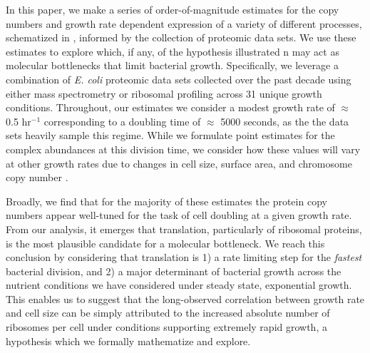 In this paper, we make a series of order-of-magnitude estimates for the copy
numbers and growth rate dependent expression of a variety of different
processes, schematized in , informed by the collection of
proteomic data sets. We use these estimates to explore which, if any, of the
hypothesis illustrated n  may act as molecular bottlenecks
that limit bacterial growth. Specifically, we leverage a combination of
\textit{E. coli} proteomic data sets collected over the past decade using
either mass spectrometry \citep{schmidt2016, peebo2015, valgepea2013} or
ribosomal profiling \citep{li2014} across 31 unique growth conditions.
Throughout, our estimates we consider a modest growth rate of $\approx$ 0.5
hr$^{-1}$ corresponding to a doubling time of $\approx$ 5000 seconds, as the
the data sets heavily sample this regime. While we formulate point estimates
for the complex abundances at this division time, we consider how these
values will vary at other growth rates due to changes in cell size, surface
area, and chromosome copy number \citep{taheriaraghi2015}.


Broadly, we find that for the majority of these estimates the protein copy
numbers appear well-tuned for the task of cell doubling at a given growth
rate. From our analysis, it emerges that translation, particularly of
ribosomal proteins, is the most plausible candidate for a molecular
bottleneck. We reach this conclusion by considering that translation is 1) a
rate limiting step for the \textit{fastest} bacterial division, and 2) a
major determinant of bacterial growth across the nutrient conditions we have
considered under steady state, exponential growth. This  enables us to suggest that the
long-observed correlation between growth rate and cell size
\citep{schaechter1958, si2017} can be simply attributed to the increased
absolute number of ribosomes per cell under conditions supporting extremely
rapid growth, a hypothesis which we formally mathematize and explore.

